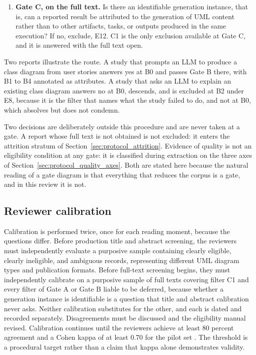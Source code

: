\begin{enumerate}[label=\textbf{Step \arabic*.},leftmargin=*,itemsep=0.4em]
    \item \textbf{Gate C, on the full text.} Is there an identifiable generation instance, that is, can a reported result be attributed to the generation of UML content rather than to other artifacts, tasks, or outputs produced in the same execution? If no, exclude, E12. C1 is the only exclusion available at Gate C, and it is answered with the full text open.

\end{enumerate}

Two reports illustrate the route. A study that prompts an LLM to produce a class diagram from user stories answers yes at B0 and passes Gate B there, with B1 to B4 annotated as attributes. A study that asks an LLM to explain an existing class diagram answers no at B0, descends, and is excluded at B2 under E8, because it is the filter that names what the study failed to do, and not at B0, which absolves but does not condemn.

Two decisions are deliberately outside this procedure and are never taken at a gate. A report whose full text is not obtained is not excluded: it enters the attrition stratum of Section~\ref{sec:protocol_attrition}. Evidence of quality is not an eligibility condition at any gate: it is classified during extraction on the three axes of Section~\ref{sec:protocol_quality_axes}. Both are stated here because the natural reading of a gate diagram is that everything that reduces the corpus is a gate, and in this review it is not.

\subsection{Reviewer calibration}

Calibration is performed twice, once for each reading moment, because the questions differ. Before production title and abstract screening, the reviewers must independently evaluate a purposive sample containing clearly eligible, clearly ineligible, and ambiguous records, representing different UML diagram types and publication formats. Before full-text screening begins, they must independently calibrate on a purposive sample of full texts covering filter C1 and every filter of Gate A or Gate B liable to be deferred, because whether a generation instance is identifiable is a question that title and abstract calibration never asks. Neither calibration substitutes for the other, and each is dated and recorded separately. Disagreements must be discussed and the eligibility manual revised. Calibration continues until the reviewers achieve at least 80 percent agreement and a Cohen kappa of at least 0.70 for the pilot set \cite{Cohen1960Kappa}. The threshold is a procedural target rather than a claim that kappa alone demonstrates validity.

